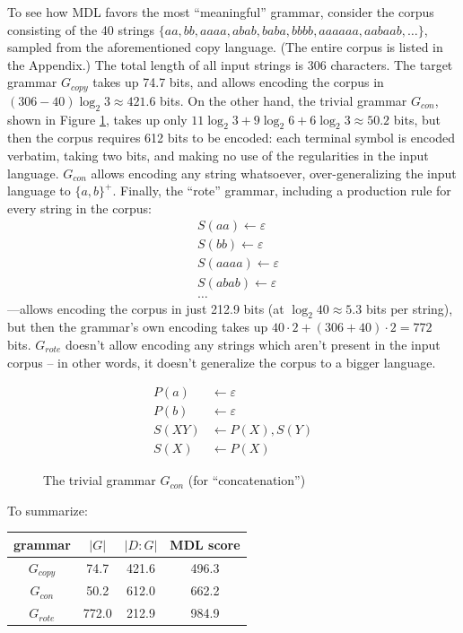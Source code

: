 \documentclass{article}
\begin{document}
To see how MDL favors the most ``meaningful'' grammar, consider the corpus consisting of the 40 strings
$\{aa, bb, aaaa, abab, baba, bbbb, aaaaaa, aabaab, \ldots\}$,
sampled from the aforementioned copy language. (The entire corpus is listed in the Appendix.) 
The total length of all input strings is 306 characters.
The target grammar $G_{copy}$ takes up 74.7 bits, and allows encoding the corpus in
$(306-40)\log_2 3\approx 421.6$ bits.
On the other hand, the trivial grammar $G_{con}$, shown in Figure \ref{fig:Gcon},
takes up only $11\log_2 3 + 9\log_2 6 + 6\log_2 3 \approx 50.2$ bits,
but then the corpus requires 612 bits to be encoded: each terminal symbol is encoded verbatim,
taking two bits, and making no use of the regularities in the input language.
$G_{con}$ allows encoding any string whatsoever, over-generalizing the input language to $\{a,b\}^+$.
Finally, the ``rote'' grammar, including a production rule for every string in the corpus:
\begin{align*}
&S(aa) \leftarrow\varepsilon \\
&S(bb) \leftarrow\varepsilon \\
&S(aaaa) \leftarrow\varepsilon \\
&S(abab) \leftarrow\varepsilon \\
&\ldots
\end{align*}
---allows encoding the corpus in just 212.9 bits (at $\log_2{40}\approx5.3$ bits per string),
but then the grammar's own encoding takes up $40\cdot2+(306+40)\cdot2 = 772$ bits.
$G_{rote}$ doesn't allow encoding any strings which aren't present in the input corpus -- in other words, it doesn't generalize the corpus to a bigger language.

\begin{figure}[t]
\begin{align*}
P(a) &\leftarrow\varepsilon \\
P(b) &\leftarrow\varepsilon \\
S(XY) &\leftarrow P(X),S(Y) \\
S(X) &\leftarrow P(X)
\end{align*}
\caption{The trivial grammar $G_{con}$ (for ``concatenation'')}
\label{fig:Gcon}
\end{figure}

To summarize:
\begin{table}[h]
\begin{tabular}{ c | c c c }
 grammar & $|G|$ & $|D:G|$ & MDL score \\ 
 \hline
 $G_{copy}$ & 74.7 & 421.6 & 496.3 \\  
 $G_{con}$ & 50.2 & 612.0 & 662.2 \\
 $G_{rote}$ & 772.0 & 212.9 & 984.9
\end{tabular}
\end{table}
\end{document}
